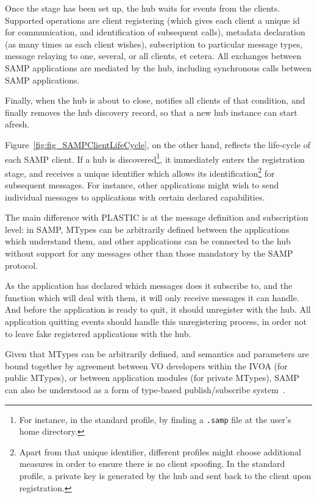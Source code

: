 		Once the stage has been set up, the hub waits for
		events from the clients. Supported operations are client
		registering (which gives each client a unique id for
		communication, and identification of subsequent calls),
		metadata declaration (as many times as each client
		wishes), subscription to particular message types, message
		relaying to one, several, or all clients, et cetera.
		All exchanges between SAMP applications are mediated by the
		hub, including synchronous calls between SAMP applications.
		
		Finally, when the hub is about to close, notifies all
		clients of that condition, and finally removes the
		hub discovery record, so that a new hub instance can start
		afresh.
		
		Figure~\ref{fig:fig_SAMPClientLifeCycle}, on the other hand,
		reflects the life-cycle of each SAMP client. If a hub is
		discovered\footnote{For instance, in the standard profile,
		by finding a \texttt{.samp} file at the user's home
		directory.}, it immediately enters the registration stage,
		and receives a unique identifier which allows its
		identification\footnote{Apart from that unique identifier,
		different profiles might choose additional measures in
		order to ensure there is no client spoofing. In the
		standard profile, a private key is generated by the hub
		and sent back to the client upon registration.} for
		subsequent messages. For instance, other applications might
		wish to send individual messages to applications with
		certain declared capabilities.
		
		The main difference with PLASTIC is at the message definition
		and subscription level: in SAMP, MTypes can be arbitrarily
		defined between the applications which understand them, and
		other applications can be connected to the hub without
		support for any messages other than those mandatory by the
		SAMP protocol.
		
		As the application has declared which messages does it
		subscribe to, and the function which will deal with them,
		it will only receive messages it can handle. And before
		the application is ready to quit, it should unregister
		with the hub. All application quitting events should
		handle this unregistering process, in order not to leave
		fake registered applications with the hub.
		
		Given that MTypes can be arbitrarily defined, and semantics
		and parameters are bound together by agreement between VO 
		developers within the IVOA (for public MTypes), or between
		application modules (for private MTypes), SAMP can also 
		be understood as a form of type-based publish/subscribe
		system~\cite{857078}.
		
